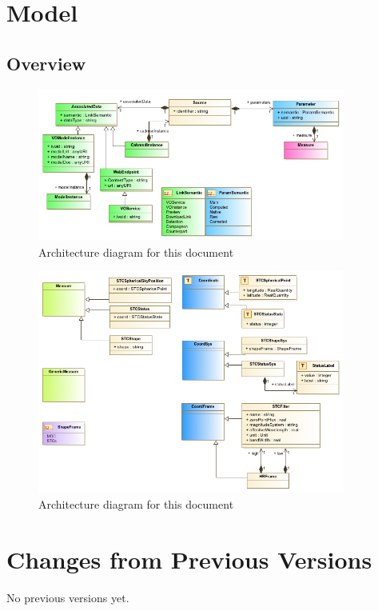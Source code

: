 \documentclass[11pt,a4paper]{ivoa}
\begin{document}
\section{Model}
\subsection{Overview}
\begin{figure}
\includegraphics[width=0.9\textwidth]{../model/overview_diagram.png}
\caption{Architecture diagram for this document}
\label{fig:archdiag}
\end{figure}



\begin{figure}
\includegraphics[width=0.9\textwidth]{../model/stc_ext_diagram.png}
\caption{Architecture diagram for this document}
\label{fig:archdiag}
\end{figure}



\appendix
\section{Changes from Previous Versions}

No previous versions yet.  



\end{document}
